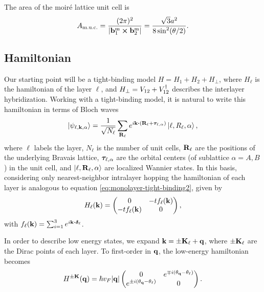 \documentclass[a4paper,12pt]{report}
\begin{document}
The area of the moiré lattice unit cell is
\begin{equation} \label{eq:moire-unitcell}
A_{\text{m.u.c.}} = \frac{(2\pi)^2}{\abs{{\vb{b}}_1^{\text{m}} \cross {\vb{b}}_2^{\text{m}}}} = \frac{\sqrt{3} a^2}{8 \sin[2](\theta/2)}.
\end{equation}

\subsection{Hamiltonian}

Our starting point will be a tight-binding model $ H = H_1 + H_2 + H_{\perp} $, where $H_\ell$ is the hamiltonian of the layer $\ell$, and $H_\perp = V_{12} + V_{12}^{\dagger}$ describes the interlayer hybridization. Working with a tight-binding model, it is natural to write this hamiltonian in terms of Bloch waves
\begin{equation} \label{eq:BM-blochwave}
\ket{\psi_{\ell, \k, \alpha}} = \frac{1}{\sqrt{N_\ell}} \sum_{\R_\ell} e^{i \k \vdot (\R_\ell + \vtau_{\ell,\alpha})} \ket{\ell, R_\ell, \alpha},
\end{equation}
where $\ell$ labels the layer, $N_\ell$ is the number of unit cells, ${\vb{R}}_\ell$ are the positions of the underlying Bravais lattice, ${\bm{\tau}}_{\ell,\alpha}$ are the orbital centers (of sublattice $\alpha = A,B$) in the unit cell, and $\ket{\ell,{\vb{R}}_\ell,\alpha}$ are localized Wannier states. In this basis, considering only nearest-neighbor intralayer hopping the hamiltonian of each layer is analogous to equation \ref{eq:monolayer-tight-binding2}, given by
\begin{equation} \label{eq:blg-eachlayer-hamil}
H_\ell({\vb{k}}) =
\begin{pmatrix}
0 & -t f_\ell({\vb{k}}) \\
-t f_\ell({\vb{k}}) & 0
\end{pmatrix},
\end{equation}
with $f_\ell(\k) = \sum_{i=1}^{3} e^{i\k \vdot \vdelta_\ell}$.

In order to describe low energy states, we expand ${\vb{k}} = \pm {\vb{K}}_\ell + {\vb{q}}$, where $\pm {\vb{K}}_\ell$ are the Dirac points of each layer. To first-order in ${\vb{q}}$, the low-energy hamiltonian becomes
\begin{equation} \label{eq:blg-eachlayer-hamil-lowenergy}
H^{\pm {\vb{K}}}({\vb{q}}) = \hbar v_F \abs{{\vb{q}}}
\begin{pmatrix}
0 & e^{\mp i (\theta_{\vb{q}} - \theta_\ell)} \\
e^{\pm i (\theta_{\vb{q}} - \theta_\ell)} & 0
\end{pmatrix}.
\end{equation}
\end{document}
